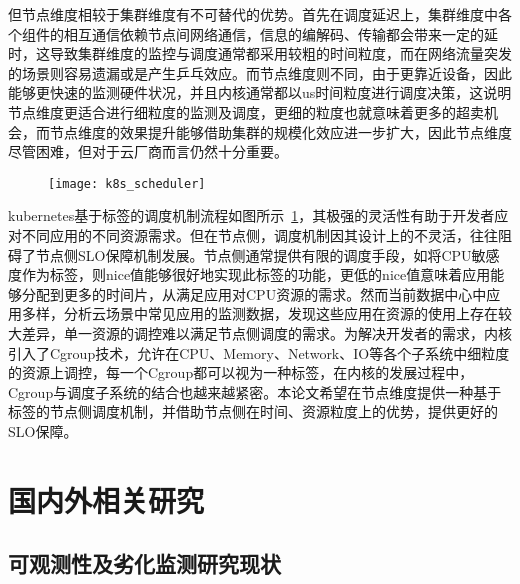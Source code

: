 但节点维度相较于集群维度有不可替代的优势。首先在调度延迟上，集群维度中各个组件的相互通信依赖节点间网络通信，信息的编解码、传输都会带来一定的延时，这导致集群维度的监控与调度通常都采用较粗的时间粒度，而在网络流量突发的场景则容易遗漏或是产生乒乓效应。而节点维度则不同，由于更靠近设备，因此能够更快速的监测硬件状况，并且内核通常都以us时间粒度进行调度决策，这说明节点维度更适合进行细粒度的监测及调度，更细的粒度也就意味着更多的超卖机会，而节点维度的效果提升能够借助集群的规模化效应进一步扩大，因此节点维度尽管困难，但对于云厂商而言仍然十分重要。

\begin{figure}[!htbp]
    \centering
    \texttt{[image: k8s\_scheduler]}
    \label{fig:k8s_scheduler}
\end{figure}

kubernetes基于标签的调度机制流程如图所示~\ref{fig:k8s_scheduler}，其极强的灵活性有助于开发者应对不同应用的不同资源需求。但在节点侧，调度机制因其设计上的不灵活，往往阻碍了节点侧SLO保障机制发展。节点侧通常提供有限的调度手段，如将CPU敏感度作为标签，则nice值能够很好地实现此标签的功能，更低的nice值意味着应用能够分配到更多的时间片，从满足应用对CPU资源的需求。然而当前数据中心中应用多样，分析云场景中常见应用的监测数据，发现这些应用在资源的使用上存在较大差异，单一资源的调控难以满足节点侧调度的需求。为解决开发者的需求，内核引入了Cgroup技术，允许在CPU、Memory、Network、IO等各个子系统中细粒度的资源上调控，每一个Cgroup都可以视为一种标签，在内核的发展过程中，Cgroup与调度子系统的结合也越来越紧密。本论文希望在节点维度提供一种基于标签的节点侧调度机制，并借助节点侧在时间、资源粒度上的优势，提供更好的SLO保障。

\section{国内外相关研究}

\subsection{可观测性及劣化监测研究现状}

